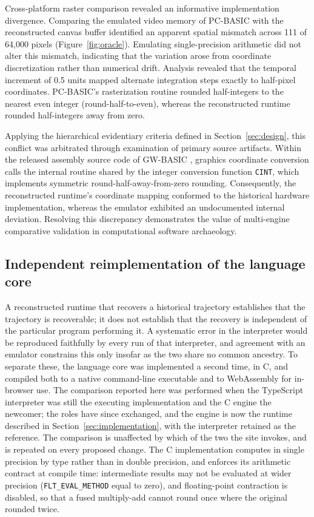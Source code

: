 \documentclass[3p,times,authoryear,twocolumn]{elsarticle}
\begin{document}
Cross-platform raster comparison revealed an informative implementation divergence. Comparing the emulated video memory of PC-BASIC with the reconstructed canvas buffer identified an apparent spatial mismatch across 111 of 64,000 pixels (Figure~\ref{fig:oracle}). Emulating single-precision arithmetic did not alter this mismatch, indicating that the variation arose from coordinate discretization rather than numerical drift. Analysis revealed that the temporal increment of 0.5 units mapped alternate integration steps exactly to half-pixel coordinates. PC-BASIC's rasterization routine rounded half-integers to the nearest even integer (round-half-to-even), whereas the reconstructed runtime rounded half-integers away from zero. 

Applying the hierarchical evidentiary criteria defined in Section~\ref{sec:design}, this conflict was arbitrated through examination of primary source artifacts. Within the released assembly source code of GW-BASIC \citep{gwbasic}, graphics coordinate conversion calls the internal routine shared by the integer conversion function \texttt{CINT}, which implements symmetric round-half-away-from-zero rounding. Consequently, the reconstructed runtime's coordinate mapping conformed to the historical hardware implementation, whereas the emulator exhibited an undocumented internal deviation. Resolving this discrepancy demonstrates the value of multi-engine comparative validation in computational software archaeology.

\subsection{Independent reimplementation of the language core}

A reconstructed runtime that recovers a historical trajectory establishes that the trajectory is recoverable; it does not establish that the recovery is independent of the particular program performing it. A systematic error in the interpreter would be reproduced faithfully by every run of that interpreter, and agreement with an emulator constrains this only insofar as the two share no common ancestry. To separate these, the language core was implemented a second time, in C, and compiled both to a native command-line executable and to WebAssembly for in-browser use. The comparison reported here was performed when the TypeScript interpreter was still the executing implementation and the C engine the newcomer; the roles have since exchanged, and the engine is now the runtime described in Section~\ref{sec:implementation}, with the interpreter retained as the reference. The comparison is unaffected by which of the two the site invokes, and is repeated on every proposed change. The C implementation computes in single precision by type rather than in double precision, and enforces its arithmetic contract at compile time: intermediate results may not be evaluated at wider precision (\texttt{FLT\_EVAL\_METHOD} equal to zero), and floating-point contraction is disabled, so that a fused multiply-add cannot round once where the original rounded twice.
\end{document}

